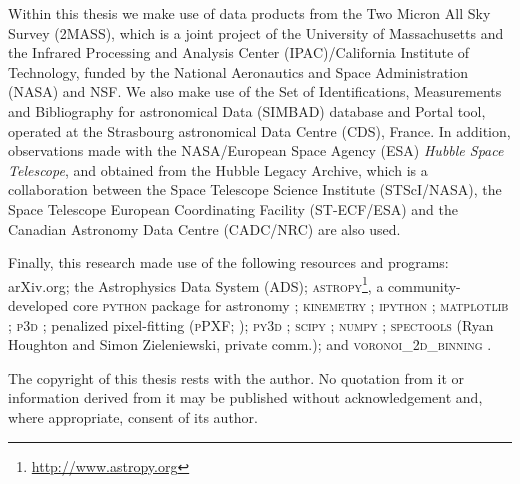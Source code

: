 \begin{originalitylong}
Within this thesis we make use of data products from the Two Micron All Sky Survey (2MASS), which is a joint project of the University of Massachusetts and the Infrared Processing and Analysis Center (IPAC)/California Institute of Technology, funded by the National Aeronautics and Space Administration (NASA) and NSF. We also make use of the Set of Identifications, Measurements and Bibliography for astronomical Data (SIMBAD) database and Portal tool, operated at the Strasbourg astronomical Data Centre (CDS), France. In addition, observations made with the NASA/European Space Agency (ESA) \textit{Hubble Space Telescope}, and obtained from the Hubble Legacy Archive, which is a collaboration between the Space Telescope Science Institute (STScI/NASA), the Space Telescope European Coordinating Facility (ST-ECF/ESA) and the Canadian Astronomy Data Centre (CADC/NRC) are also used.

Finally, this research made use of the following resources and programs: arXiv.org; the Astrophysics Data System (ADS); \textsc{astropy}\footnote{\url{http://www.astropy.org}}, a community-developed core \textsc{python} package for astronomy \citep{TheAstropyCollaboration2013}; \textsc{kinemetry} \citep{Krajnovic2006}; \textsc{ipython} \citep{Perez2007}; \textsc{matplotlib} \citep{Hunter2007}; \textsc{p3d} \citep{Sandin2010, Sandin2011}; penalized pixel-fitting (\textsc{pPXF}; \citealt{Cappellari2004}); \textsc{py3d} \citep{Sanchez2011, Husemann2013, Husemann2014}; \textsc{scipy} \citep{Oliphant2007, Millman2011}; \textsc{numpy} \citep{VanderWalt2011}; \textsc{spectools} (Ryan Houghton and Simon Zieleniewski, private comm.); and \textsc{voronoi\_2d\_binning} \citep[including the SAURON colourmaps; ][]{Cappellari2003}.

The copyright of this thesis rests with the author. No quotation from it or information derived from it may be published without acknowledgement and, where appropriate, consent of its author.
\end{originalitylong}